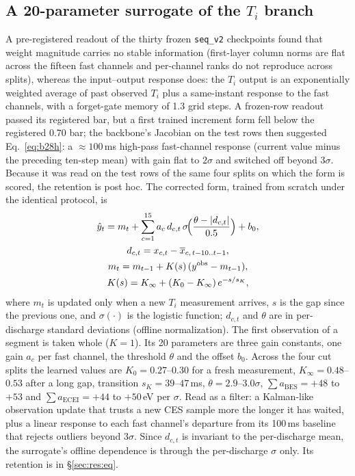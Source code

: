 \documentclass[10pt,twocolumn,letterpaper]{article}
\newcommand{\Ti}{\ensuremath{T_i}}
\newcommand{\seqv}{\texttt{seq\_v2}}
\begin{document}
\subsection{A 20-parameter surrogate of the \texorpdfstring{\Ti{}}{Ti} branch}
\label{sec:model:eq}
A pre-registered readout of the thirty frozen \seqv{} checkpoints found that weight
magnitude carries no stable information (first-layer column norms are flat across the
fifteen fast channels and per-channel ranks do not reproduce across splits), whereas
the input--output response does: the \Ti{} output is an exponentially weighted average
of past observed \Ti{} plus a same-instant response to the fast channels, with a
forget-gate memory of 1.3 grid steps. A frozen-row readout passed its registered bar, but a first trained
increment form fell below the registered 0.70 bar; the backbone's Jacobian on the test
rows then suggested Eq.~\eqref{eq:b28h}: a ${\approx}100$\,ms high-pass fast-channel
response (current value minus the preceding ten-step mean) with gain flat to $2\sigma$
and switched off beyond $3\sigma$. Because it was read on the test rows of the same four
splits on which the form is scored, the retention is post hoc. The corrected form,
trained from scratch under the identical protocol, is
\begin{gather}
  \hat y_t = m_t + \sum_{c=1}^{15} a_c\, d_{c,t}\,
     \sigma\!\Bigl(\frac{\theta-|d_{c,t}|}{0.5}\Bigr) + b_0,
  \label{eq:b28h}\\
  d_{c,t} = x_{c,t} - \overline{x}_{c,\,t-10..t-1},
  \nonumber\\
  m_t = m_{t-1} + K(s)\,(y^\mathrm{obs} - m_{t-1}),
  \nonumber\\
  K(s) = K_\infty + (K_0 - K_\infty)\,e^{-s/s_K},
  \label{eq:gain}
\end{gather}
where $m_t$ is updated only when a new \Ti{} measurement arrives, $s$ is the gap since
the previous one, and $\sigma(\cdot)$ is the logistic function; $d_{c,t}$ and $\theta$
are in per-discharge standard deviations (offline normalization). The first observation
of a segment is taken whole ($K=1$). Its 20 parameters
are three gain constants, one gain $a_c$ per fast channel, the threshold $\theta$ and
the offset $b_0$. Across the four cut splits the learned values are
$K_0 = 0.27$--$0.30$ for a fresh measurement, $K_\infty = 0.48$--$0.53$ after a long
gap, transition $s_K = 39$--$47$\,ms, $\theta = 2.9$--$3.0\sigma$,
$\sum a_{\mathrm{BES}} = +48$ to $+53$ and $\sum a_{\mathrm{ECEI}} = +44$ to $+50$\,eV
per $\sigma$. Read as a filter: a Kalman-like observation update that trusts a new CES
sample more the longer it has waited, plus a linear response to each fast channel's
departure from its 100\,ms baseline that rejects outliers beyond $3\sigma$. Since
$d_{c,t}$ is invariant to the per-discharge mean, the surrogate's offline dependence is
through the per-discharge $\sigma$ only. Its retention is in \S\ref{sec:res:eq}.
\end{document}
